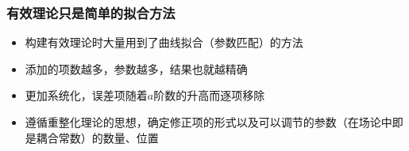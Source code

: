 \documentclass[8pt]{beamer}
\begin{document}
\begin{frame}
\frametitle{有效理论只是简单的拟合方法}
\begin{itemize}
  \item 构建有效理论时大量用到了曲线拟合（参数匹配）的方法
  \vspace{12pt}
  \item 添加的项数越多，参数越多，结果也就越精确
  \vspace{12pt}
  \item 更加系统化，误差项随着$a$阶数的升高而逐项移除
  \vspace{12pt}
  \item 遵循重整化理论的思想，确定修正项的形式以及可以调节的参数（在场论中即是耦合常数）的数量、位置
\end{itemize}
\end{frame}
%
\end{document}
